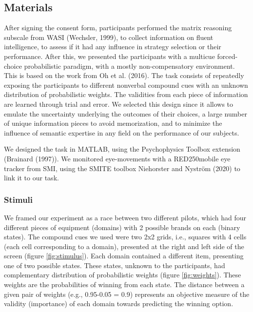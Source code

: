 \documentclass[
  english,
  man]{apa6}
\begin{document}
\hypertarget{materials}{%
\subsection{Materials}\label{materials}}

After signing the consent form, participants performed the matrix reasoning subscale from WASI (Wechsler, 1999), to collect information on fluent intelligence, to assess if it had any influence in strategy selection or their performance. After this, we presented the participants with a multicue forced-choice probabilistic paradigm, with a mostly non-compensatory environment. This is based on the work from Oh et al. (2016). The task consists of repeatedly exposing the participants to different nonverbal compound cues with an unknown distribution of probabilistic weights. The validities from each piece of information are learned through trial and error. We selected this design since it allows to emulate the uncertainty underlying the outcomes of their choices, a large number of unique information pieces to avoid memorization, and to minimize the influence of semantic expertise in any field on the performance of our subjects.

We designed the task in MATLAB, using the Psychophysics Toolbox extension (Brainard (1997)). We monitored eye-movements with a RED250mobile eye tracker from SMI, using the SMITE toolbox Niehorster and Nyström (2020) to link it to our task.

\hypertarget{stimuli}{%
\subsubsection{Stimuli}\label{stimuli}}

We framed our experiment as a race between two different pilots, which had four different pieces of equipment (domains) with 2 possible brands on each (binary states). The compound cues we used were two 2x2 grids, i.e., squares with 4 cells (each cell corresponding to a domain), presented at the right and left side of the screen (figure \ref{fig:stimulus}). Each domain contained a different item, presenting one of two possible states. These states, unknown to the participants, had complementary distribution of probabilistic weights (figure \ref{fig:weights}). These weights are the probabilities of winning from each state. The distance between a given pair of weights (e.g., 0.95-0.05 = 0.9) represents an objective measure of the validity (importance) of each domain towards predicting the winning option.
\end{document}
